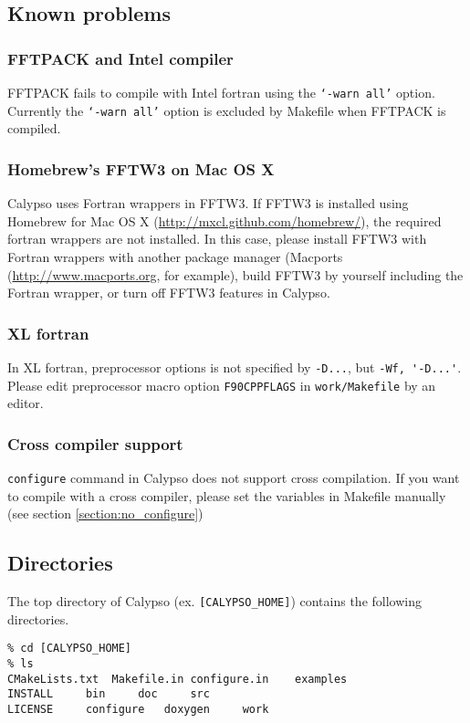\subsection{Known problems}
\subsubsection*{FFTPACK and Intel compiler}
FFTPACK fails to compile with Intel fortran using the {\tt `-warn all'} option. Currently the {\tt `-warn all'} option is excluded by Makefile when FFTPACK is compiled.

\subsubsection*{Homebrew's FFTW3 on Mac OS X}
Calypso uses Fortran wrappers in FFTW3. If FFTW3 is installed using Homebrew for Mac OS X (\url{http://mxcl.github.com/homebrew/}), the required fortran wrappers are not installed. In this case, please install FFTW3 with Fortran wrappers with another package manager (Macports (\url{http://www.macports.org}, for example), build FFTW3 by yourself including the Fortran wrapper, or turn off FFTW3 features in Calypso.

\subsubsection*{XL fortran}
In XL fortran, preprocessor options is not specified by \verb|-D...|, but \verb|-Wf, '-D...'|. Please edit preprocessor macro option \verb|F90CPPFLAGS| in \verb|work/Makefile| by an editor.

\subsubsection*{Cross compiler support}
{\tt configure} command in Calypso does not support cross compilation. If you want to compile with a cross compiler, please set the variables in Makefile manually (see section \ref{section:no_configure})

\subsection{Directories}

The top directory of Calypso (ex. \verb|[CALYPSO_HOME]|) contains the following directories.
\begin{verbatim}
% cd [CALYPSO_HOME]
% ls
CMakeLists.txt	Makefile.in	configure.in	examples
INSTALL		bin		doc		src
LICENSE		configure	doxygen		work

\end{verbatim}


